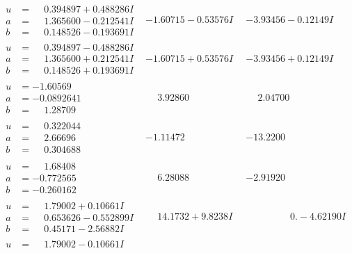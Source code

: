 \documentclass[1p]{elsarticle_modified}
\theoremstyle{definition}
\begin{document}
$$\begin{array}{c|c|c}
\begin{aligned}
u &= \phantom{-}0.394897 + 0.488286 I \\
a &= \phantom{-}1.365600 - 0.212541 I \\
b &= \phantom{-}0.148526 - 0.193691 I\end{aligned}
 & -1.60715 - 0.53576 I & -3.93456 - 0.12149 I \\ \hline\begin{aligned}
u &= \phantom{-}0.394897 - 0.488286 I \\
a &= \phantom{-}1.365600 + 0.212541 I \\
b &= \phantom{-}0.148526 + 0.193691 I\end{aligned}
 & -1.60715 + 0.53576 I & -3.93456 + 0.12149 I \\ \hline\begin{aligned}
u &= -1.60569\phantom{ +0.000000I} \\
a &= -0.0892641\phantom{ +0.000000I} \\
b &= \phantom{-}1.28709\phantom{ +0.000000I}\end{aligned}
 & \phantom{-}3.92860\phantom{ +0.000000I} & \phantom{-}2.04700\phantom{ +0.000000I} \\ \hline\begin{aligned}
u &= \phantom{-}0.322044\phantom{ +0.000000I} \\
a &= \phantom{-}2.66696\phantom{ +0.000000I} \\
b &= \phantom{-}0.304688\phantom{ +0.000000I}\end{aligned}
 & -1.11472\phantom{ +0.000000I} & -13.2200\phantom{ +0.000000I} \\ \hline\begin{aligned}
u &= \phantom{-}1.68408\phantom{ +0.000000I} \\
a &= -0.772565\phantom{ +0.000000I} \\
b &= -0.260162\phantom{ +0.000000I}\end{aligned}
 & \phantom{-}6.28088\phantom{ +0.000000I} & -2.91920\phantom{ +0.000000I} \\ \hline\begin{aligned}
u &= \phantom{-}1.79002 + 0.10661 I \\
a &= \phantom{-}0.653626 - 0.552899 I \\
b &= \phantom{-}0.45171 - 2.56882 I\end{aligned}
 & \phantom{-}14.1732 + 9.8238 I & \phantom{-0.000000 } 0. - 4.62190 I \\ \hline\begin{aligned}
u &= \phantom{-}1.79002 - 0.10661 I \\

\end{aligned}
\end{array}$$
\end{document}
